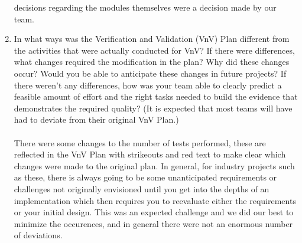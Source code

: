 \documentclass[12pt, titlepage]{article}
\begin{document}
\begin{enumerate}
    decisions regarding the modules themselves were a decision made by our team.
  \item In what ways was the Verification and Validation (VnV) Plan different
    from the activities that were actually conducted for VnV?  If there were
    differences, what changes required the modification in the plan?  Why did
    these changes occur?  Would you be able to anticipate these
    changes in future
    projects?  If there weren't any differences, how was your team
    able to clearly
    predict a feasible amount of effort and the right tasks needed to build the
    evidence that demonstrates the required quality?  (It is expected that most
    teams will have had to deviate from their original VnV Plan.)\\
    \\
    There were some changes to the number of tests performed, these are reflected in the VnV Plan with strikeouts and red text
    to make clear which changes were made to the original plan. In general, for industry projects such as these,
    there is always going to be some unanticipated requirements or challenges not originally envisioned until you get into the depths
    of an implementation which then requires you to reevaluate either the requirements or your initial design. This was an expected
    challenge and we did our best to minimize the occurences, and in general there were not an enormous number of deviations.
\end{enumerate}
\end{document}
